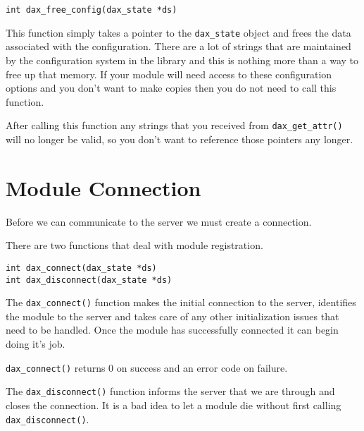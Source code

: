 \begin{verbatim}
int dax_free_config(dax_state *ds)
\end{verbatim}

This function simply takes a pointer to the \verb|dax_state| object and frees the data associated with the configuration.  There are a lot of strings that are maintained by the configuration system in the library and this is nothing more than a way to free up that memory.  If your module will need access to these configuration options and you don't want to make copies then you do not need to call this function.

After calling this function any strings that you received from \verb|dax_get_attr()| will no longer be valid, so you don't want to reference those pointers any longer.

\section{Module Connection}
Before we can communicate to the server we must create a connection.

There are two functions that deal with module registration.
\begin{verbatim}
int dax_connect(dax_state *ds)
int dax_disconnect(dax_state *ds)
\end{verbatim}

The \verb|dax_connect()| function makes the initial connection to the server, identifies the module to the server and takes care of any other initialization issues that need to be handled.  Once the module has successfully connected it can begin doing it's job.

\verb|dax_connect()| returns 0 on success and an error code on failure.

The \verb|dax_disconnect()| function informs the server that we are through and closes the connection.  It is a bad idea to let a module die without first calling \verb|dax_disconnect()|.
